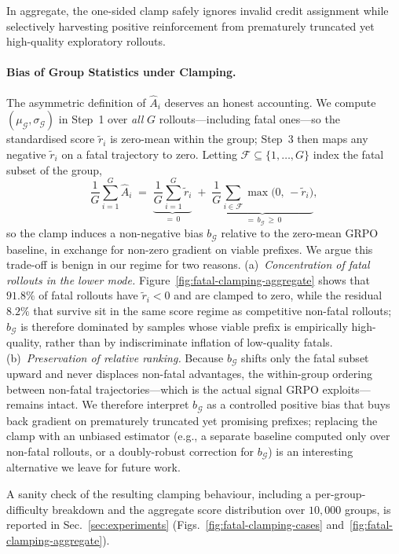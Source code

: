 In aggregate, the one-sided clamp safely ignores invalid credit assignment while selectively harvesting positive reinforcement from prematurely truncated yet high-quality exploratory rollouts.

\paragraph{Bias of Group Statistics under Clamping.}
The asymmetric definition of $\hat{A}_i$ deserves an honest accounting. We compute $(\mu_\mathcal{G},\sigma_\mathcal{G})$ in Step~1 over \emph{all} $G$ rollouts---including fatal ones---so the standardised score $\widetilde{r}_i$ is zero-mean within the group; Step~3 then maps any negative $\widetilde{r}_i$ on a fatal trajectory to zero. Letting $\mathcal{F} \subseteq \{1,\dots,G\}$ index the fatal subset of the group,
\begin{equation}
  \frac{1}{G}\sum_{i=1}^{G} \hat{A}_i \;=\; \underbrace{\frac{1}{G}\sum_{i=1}^{G} \widetilde{r}_i}_{=\,0} \;+\; \underbrace{\frac{1}{G}\sum_{i \in \mathcal{F}} \max\!\bigl(0,\,-\widetilde{r}_i\bigr)}_{\;=\,b_\mathcal{G}\,\ge\,0},
  \label{eq:clamp-bias}
\end{equation}
so the clamp induces a non-negative bias $b_\mathcal{G}$ relative to the zero-mean GRPO baseline, in exchange for non-zero gradient on viable prefixes. We argue this trade-off is benign in our regime for two reasons. (a)~\emph{Concentration of fatal rollouts in the lower mode.} Figure~\ref{fig:fatal-clamping-aggregate} shows that $91.8\%$ of fatal rollouts have $\widetilde{r}_i < 0$ and are clamped to zero, while the residual $8.2\%$ that survive sit in the same score regime as competitive non-fatal rollouts; $b_\mathcal{G}$ is therefore dominated by samples whose viable prefix is empirically high-quality, rather than by indiscriminate inflation of low-quality fatals. (b)~\emph{Preservation of relative ranking.} Because $b_\mathcal{G}$ shifts only the fatal subset upward and never displaces non-fatal advantages, the within-group ordering between non-fatal trajectories---which is the actual signal GRPO exploits---remains intact. We therefore interpret $b_\mathcal{G}$ as a controlled positive bias that buys back gradient on prematurely truncated yet promising prefixes; replacing the clamp with an unbiased estimator (e.g., a separate baseline computed only over non-fatal rollouts, or a doubly-robust correction for $b_\mathcal{G}$) is an interesting alternative we leave for future work.

A sanity check of the resulting clamping behaviour, including a per-group-difficulty breakdown and the aggregate score distribution over $10{,}000$ groups, is reported in Sec.~\ref{sec:experiments} (Figs.~\ref{fig:fatal-clamping-cases} and~\ref{fig:fatal-clamping-aggregate}).




